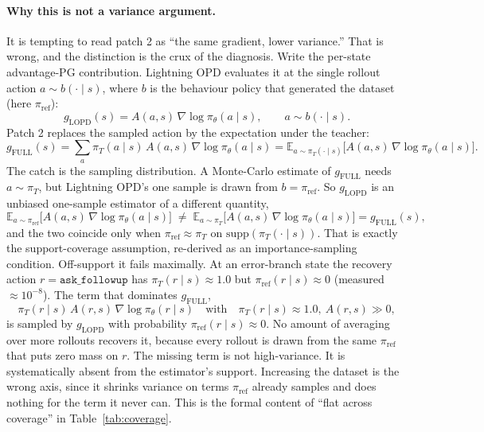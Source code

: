 \documentclass[11pt]{article}
\newcommand{\code}[1]{\texttt{#1}}
\begin{document}
\paragraph{Why this is not a variance argument.}
It is tempting to read patch 2 as ``the same gradient, lower variance.'' That is
wrong, and the distinction is the crux of the diagnosis. Write the per-state
advantage-PG contribution. Lightning OPD evaluates it at the single rollout action
$a \sim b(\cdot\mid s)$, where $b$ is the behaviour policy that generated the
dataset (here $\pi_{\mathrm{ref}}$):\[
g_{\mathrm{LOPD}}(s) = A(a,s)\,\nabla\log\pi_\theta(a\mid s),
\qquad a \sim b(\cdot\mid s).
\]
Patch 2 replaces the sampled action by the expectation under the teacher:
\[
g_{\mathrm{FULL}}(s) = \sum_a \pi_T(a\mid s)\,A(a,s)\,\nabla\log\pi_\theta(a\mid s)
= \mathbb{E}_{a \sim \pi_T(\cdot\mid s)}\!\bigl[A(a,s)\,\nabla\log\pi_\theta(a\mid s)\bigr].
\]
The catch is the sampling distribution. A Monte-Carlo estimate of $g_{\mathrm{FULL}}$
needs $a \sim \pi_T$, but Lightning OPD's one sample is drawn from
$b = \pi_{\mathrm{ref}}$. So $g_{\mathrm{LOPD}}$ is an unbiased one-sample estimator
of a different quantity,
\[
\mathbb{E}_{a \sim \pi_{\mathrm{ref}}}\!\bigl[A(a,s)\,\nabla\log\pi_\theta(a\mid s)\bigr]
\;\neq\;
\mathbb{E}_{a \sim \pi_T}\!\bigl[A(a,s)\,\nabla\log\pi_\theta(a\mid s)\bigr]
= g_{\mathrm{FULL}}(s),
\]
and the two coincide only when $\pi_{\mathrm{ref}} \approx \pi_T$ on
$\mathrm{supp}(\pi_T(\cdot\mid s))$. That is exactly the support-coverage
assumption, re-derived as an importance-sampling condition. Off-support it fails
maximally. At an error-branch state the recovery action $r=\code{ask\_followup}$ has
$\pi_T(r\mid s)\approx 1.0$ but $\pi_{\mathrm{ref}}(r\mid s)\approx 0$ (measured
$\approx 10^{-8}$). The term that dominates $g_{\mathrm{FULL}}$,
\[
\pi_T(r\mid s)\,A(r,s)\,\nabla\log\pi_\theta(r\mid s)
\quad\text{with}\quad \pi_T(r\mid s)\approx 1.0,\ A(r,s)\gg 0,
\]
is sampled by $g_{\mathrm{LOPD}}$ with probability $\pi_{\mathrm{ref}}(r\mid s)
\approx 0$. No amount of averaging over more rollouts recovers it, because
every rollout is drawn from the same $\pi_{\mathrm{ref}}$ that puts zero mass on
$r$. The missing term is not high-variance. It is systematically absent from the
estimator's support. Increasing the dataset is the wrong axis, since it shrinks
variance on terms $\pi_{\mathrm{ref}}$ already samples and does nothing for the term
it never can. This is the formal content of ``flat across coverage'' in
Table~\ref{tab:coverage}.
\end{document}
